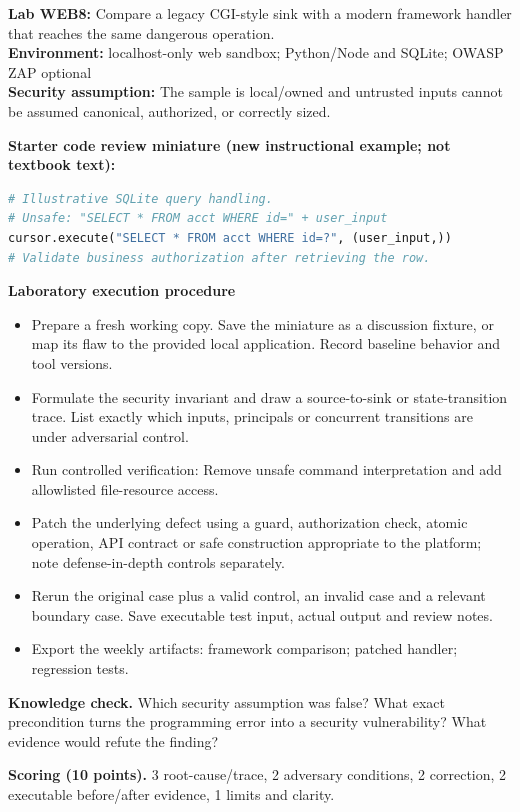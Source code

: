 \documentclass[10pt,letterpaper]{article}
\begin{document}
\begin{insight}\textbf{Lab WEB8:} Compare a legacy CGI-style sink with a modern framework handler that reaches the same dangerous operation.\\\textbf{Environment:} localhost-only web sandbox; Python/Node and SQLite; OWASP ZAP optional\\\textbf{Security assumption:} The sample is local/owned and untrusted inputs cannot be assumed canonical, authorized, or correctly sized.\end{insight}
\textbf{Starter code review miniature (new instructional example; not textbook text):}
\begin{lstlisting}[language=Python]
# Illustrative SQLite query handling.
# Unsafe: "SELECT * FROM acct WHERE id=" + user_input
cursor.execute("SELECT * FROM acct WHERE id=?", (user_input,))
# Validate business authorization after retrieving the row.
\end{lstlisting}
\textbf{Laboratory execution procedure}
\begin{itemize}[leftmargin=*,itemsep=2pt]
\item Prepare a fresh working copy. Save the miniature as a discussion fixture, or map its flaw to the provided local application. Record baseline behavior and tool versions.
\item Formulate the security invariant and draw a source-to-sink or state-transition trace. List exactly which inputs, principals or concurrent transitions are under adversarial control.
\item Run controlled verification: Remove unsafe command interpretation and add allowlisted file-resource access.
\item Patch the underlying defect using a guard, authorization check, atomic operation, API contract or safe construction appropriate to the platform; note defense-in-depth controls separately.
\item Rerun the original case plus a valid control, an invalid case and a relevant boundary case. Save executable test input, actual output and review notes.
\item Export the weekly artifacts: framework comparison; patched handler; regression tests.
\end{itemize}
\textbf{Knowledge check.} Which security assumption was false? What exact precondition turns the programming error into a security vulnerability? What evidence would refute the finding?

\textbf{Scoring (10 points).} 3 root-cause/trace, 2 adversary conditions, 2 correction, 2 executable before/after evidence, 1 limits and clarity.
\end{document}
